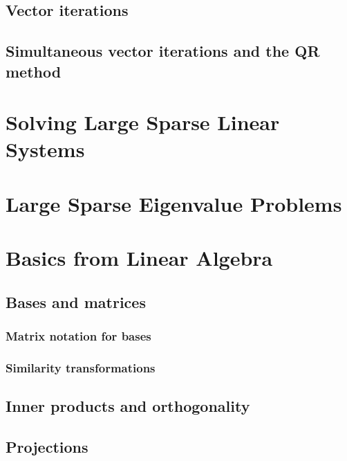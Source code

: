 \section{Vector iterations}


\section{Simultaneous vector iterations and the QR method}

%

\chapter{Solving Large Sparse Linear Systems}

\chapter{Large Sparse Eigenvalue Problems}

\appendix
\chapter{Basics from Linear Algebra}
\section{Bases and matrices}
\subsection{Matrix notation for bases}

\subsection{Similarity transformations}

\section{Inner products and orthogonality}

\section{Projections}



\printindex


